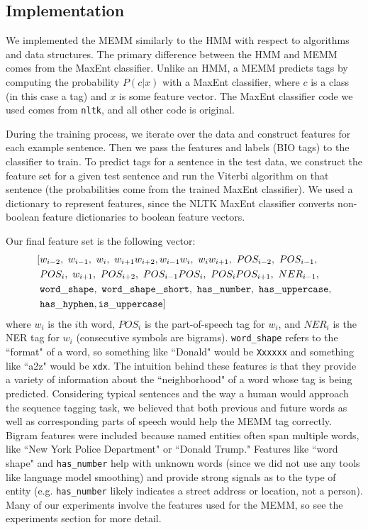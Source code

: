 \documentclass[12pt]{article}
\begin{document}
\subsection{Implementation}
We implemented the MEMM similarly to the HMM with respect to algorithms and data structures. The primary difference between the HMM and MEMM comes from the MaxEnt classifier. Unlike an HMM, a MEMM predicts tags by computing the probability $P(c|x)$ with a MaxEnt classifier, where $c$ is a class (in this case a tag) and $x$ is some feature vector. The MaxEnt classifier code we used comes from {\tt nltk}, and all other code is original. 

During the training process, we iterate over the data and construct features for each example sentence. Then we pass the features and labels (BIO tags) to the classifier to train. To predict tags for a sentence in the test data, we construct the feature set for a given test sentence and run the Viterbi algorithm on that sentence (the probabilities come from the trained MaxEnt classifier). We used a dictionary to represent features, since the NLTK MaxEnt classifier converts non-boolean feature dictionaries to boolean feature vectors.  

Our final feature set is the following vector:
\begin{equation*}
\begin{split}
[&w_{i - 2},\ w_{i - 1},\ w_i,\ w_{i + 1}w_{i + 2},
w_{i - 1}w_i,\ w_iw_{i + 1},\ POS_{i - 2},\ POS_{i - 1},\\ 
&POS_i,\ w_{i + 1},\ POS_{i + 2}, \ POS_{i - 1}POS_i,\ POS_iPOS_{i + 1},\ NER_{i - 1},\\
&{\tt word\_shape,\ word\_shape\_short,\ has\_number,\ has\_uppercase,}\\ 
&{\tt has\_hyphen, is\_uppercase}
]
\end{split}
\end{equation*}
where $w_i$ is the $i$th word, $POS_i$ is the part-of-speech tag for $w_i$, and $NER_i$ is the NER tag for $w_i$ (consecutive symbols are bigrams). {\tt word\_shape} refers to the ``format" of a word, so something like ``Donald" would be {\tt Xxxxxx} and something like ``a2z" would be {\tt xdx}. 
The intuition behind these features is that they provide a variety of information about the ``neighborhood" of a word whose tag is being predicted. Considering typical sentences and the way a human would approach the sequence tagging task, we believed that both previous and future words as well as corresponding parts of speech would help the MEMM tag correctly. Bigram features were included because named entities often span multiple words, like ``New York Police Department" or ``Donald Trump." Features like ``word shape" and {\tt has\_number} help with unknown words (since we did not use any tools like language model smoothing) and provide strong signals as to the type of entity (e.g. {\tt has\_number} likely indicates a street address or location, not a person). Many of our experiments involve the features used for the MEMM, so see the experiments section for more detail. 
\end{document}
